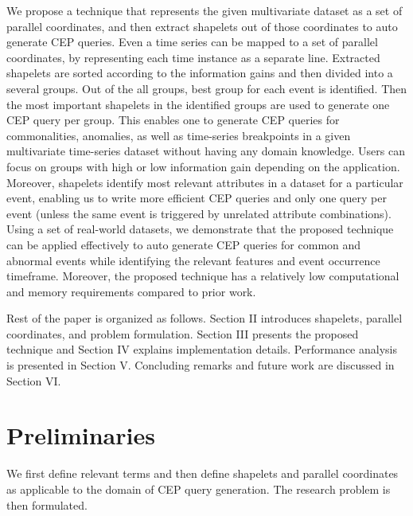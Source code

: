 \documentclass[conference]{IEEEtran}  %
\begin{document}
We propose a technique that represents the given multivariate dataset as a set of parallel coordinates, and then extract shapelets out of those coordinates to auto generate CEP queries. Even a time series can be mapped to a set of parallel coordinates, by representing each time instance as a separate line. Extracted shapelets are sorted according to the information gains and then divided into a several groups. Out of the all groups, best group for each event is identified. Then the most important shapelets in the identified groups are used to generate one CEP query per group. This enables one to generate CEP queries for commonalities, anomalies, as well as time-series breakpoints in a given multivariate time-series dataset without having any domain knowledge. Users can focus on groups with high or low information gain depending on the application. Moreover, shapelets identify most relevant attributes in a dataset for a particular event, enabling us to write more efficient CEP queries and only one query per event (unless the same event is triggered by unrelated attribute combinations). Using a set of real-world datasets, we demonstrate that the proposed technique can be applied effectively to auto generate CEP queries for common and abnormal events while identifying the relevant features and event occurrence timeframe. Moreover, the proposed technique has a relatively low computational and memory requirements compared to prior work.

Rest of the paper is organized as follows. Section II introduces shapelets, parallel coordinates, and problem formulation. Section III presents the proposed technique and Section IV explains implementation details. Performance analysis is presented in Section V. Concluding remarks and future work are discussed in Section VI.

\section{Preliminaries}
We first define relevant terms and then define shapelets and parallel coordinates as applicable to the domain of CEP query generation. The research problem is then formulated.
\end{document}
